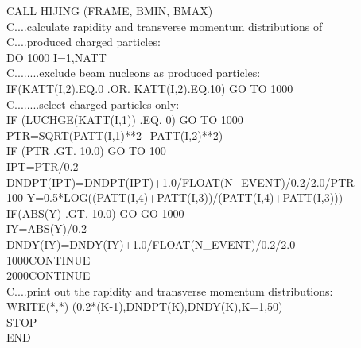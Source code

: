 {\begin{tabbing}
\>\>    \hspace{24pt}CALL HIJING (FRAME, BMIN, BMAX) \\
C....calculate rapidity and transverse momentum distributions of \> \> \\
C....produced charged particles: \>\> \\
\>\>    \hspace{24pt}DO 1000 I=1,NATT \\
C........\>\>exclude beam nucleons as produced particles: \\
\>\>    \hspace{48pt}IF(KATT(I,2).EQ.0 .OR. KATT(I,2).EQ.10) GO TO 1000 \\
C........\>\>select charged particles only: \\
\>\>    \hspace{48pt}IF (LUCHGE(KATT(I,1)) .EQ. 0) GO TO 1000 \\
\>\>    \hspace{48pt}PTR=SQRT(PATT(I,1)**2+PATT(I,2)**2)\\
\>\>    \hspace{48pt}IF (PTR .GT. 10.0) GO TO 100\\
\>\>    \hspace{48pt}IPT=PTR/0.2\\
\>\>    \hspace{48pt}DNDPT(IPT)=DNDPT(IPT)+1.0/FLOAT(N\_EVENT)/0.2/2.0/PTR\\
100\>\> \hspace{48pt}Y=0.5*LOG((PATT(I,4)+PATT(I,3))/(PATT(I,4)+PATT(I,3)))\\
\>\>    \hspace{48pt}IF(ABS(Y) .GT. 10.0) GO GO 1000\\
\>\>    \hspace{48pt}IY=ABS(Y)/0.2\\
\>\>    \hspace{48pt}DNDY(IY)=DNDY(IY)+1.0/FLOAT(N\_EVENT)/0.2/2.0\\
1000\>\>\hspace{24pt}CONTINUE \\
2000\>\>CONTINUE \\
C....print out the rapidity and transverse momentum distributions:\>\>\\
\>\>    WRITE(*,*) (0.2*(K-1),DNDPT(K),DNDY(K),K=1,50)\\
\>\>    STOP \\
\>\>    END
\end{tabbing}
                }


